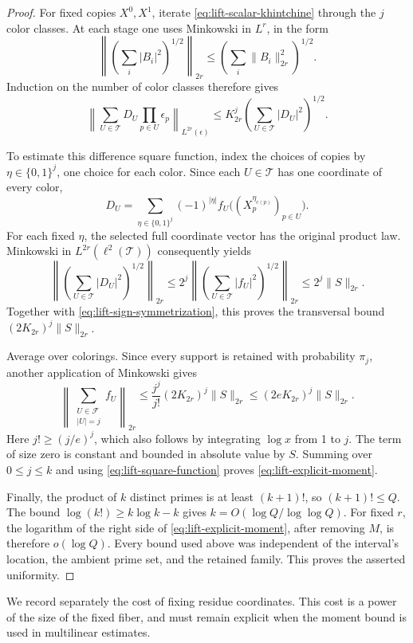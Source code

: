 \begin{proof}
For fixed copies \(X^0,X^1\), iterate
\eqref{eq:lift-scalar-khintchine} through the \(j\) color classes.
At each stage one uses Minkowski in \(L^r\), in the form
\[
 \left\|\left(\sum_i|B_i|^2\right)^{1/2}\right\|_{2r}
 \le\left(\sum_i\|B_i\|_{2r}^2\right)^{1/2}.
\]
Induction on the number of color classes therefore gives
\[
 \left\|\sum_{U\in\mathcal T}D_U\prod_{p\in U}\epsilon_p
       \right\|_{L^{2r}(\epsilon)}
 \le K_{2r}^j\left(\sum_{U\in\mathcal T}|D_U|^2\right)^{1/2}.
\]

To estimate this difference square function, index the choices of
copies by \(\eta\in\{0,1\}^j\), one choice for each color.  Since
each \(U\in\mathcal T\) has one coordinate of every color,
\[
 D_U=\sum_{\eta\in\{0,1\}^j}(-1)^{|\eta|}
    f_U\bigl((X_p^{\eta_{c(p)}})_{p\in U}\bigr).
\]
For each fixed \(\eta\), the selected full coordinate vector has
the original product law.  Minkowski in
\(L^{2r}(\ell^2(\mathcal T))\) consequently yields
\[
 \left\|\left(\sum_{U\in\mathcal T}|D_U|^2\right)^{1/2}\right\|_{2r}
 \le2^j\left\|\left(\sum_{U\in\mathcal T}|f_U|^2\right)^{1/2}\right\|_{2r}
 \le2^j\|S\|_{2r}.
\]
Together with \eqref{eq:lift-sign-symmetrization}, this proves the
transversal bound \((2K_{2r})^j\|S\|_{2r}\).

Average over colorings.  Since every support is retained with
probability \(\pi_j\), another application of Minkowski gives
\[
 \left\|\sum_{\substack{U\in\mathcal F\\|U|=j}}f_U\right\|_{2r}
 \le\frac{j^j}{j!}(2K_{2r})^j\|S\|_{2r}
 \le(2eK_{2r})^j\|S\|_{2r}.
\]
Here \(j!\ge(j/e)^j\), which also follows by integrating \(\log x\)
from 1 to \(j\).  The term of size zero is constant and bounded in
absolute value by \(S\).  Summing over \(0\le j\le k\) and using
\eqref{eq:lift-square-function} proves
\eqref{eq:lift-explicit-moment}.

Finally, the product of \(k\) distinct primes is at least
\((k+1)!\), so \((k+1)!\le Q\).  The bound
\(\log(k!)\ge k\log k-k\) gives
\(k=O(\log Q/\log\log Q)\).  For fixed \(r\), the logarithm of
the right side of \eqref{eq:lift-explicit-moment}, after removing
\(M\), is therefore \(o(\log Q)\).  Every bound used above was
independent of the interval's location, the ambient prime set, and
the retained family.  This proves the asserted uniformity.
\end{proof}

We record separately the cost of fixing residue coordinates.  This cost
is a power of the size of the fixed fiber, and must remain explicit
when the moment bound is used in multilinear estimates.

